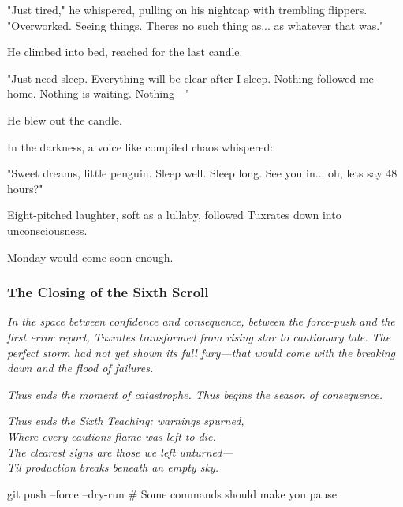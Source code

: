 "Just tired," he whispered, pulling on his nightcap with trembling flippers. "Overworked. Seeing things. There\textquotesingle s no such thing as... as whatever that was."

He climbed into bed, reached for the last candle.

"Just need sleep. Everything will be clear after I sleep. Nothing followed me home. Nothing is waiting. Nothing---"

He blew out the candle.

In the darkness, a voice like compiled chaos whispered:

"Sweet dreams, little penguin. Sleep well. Sleep long. See you in... oh, let\textquotesingle s say 48 hours?"

Eight-pitched laughter, soft as a lullaby, followed Tuxrates down into unconsciousness.

Monday would come soon enough.

\bookdivider

\subsubsection{The Closing of the Sixth Scroll}\label{the-closing-of-the-sixth-scroll}

\emph{In the space between confidence and consequence, between the force-push and the first error report, Tuxrates transformed from rising star to cautionary tale. The perfect storm had not yet shown its full fury---that would come with the breaking dawn and the flood of failures.}

\emph{Thus ends the moment of catastrophe. Thus begins the season of consequence.}

\bookdivider

\emph{Thus ends the Sixth Teaching: warnings spurned,}\\
\emph{Where every caution\textquotesingle s flame was left to die.}\\
\emph{The clearest signs are those we left unturned---}\\
\emph{\textquotesingle Til production breaks beneath an empty sky.}

\begin{codeblock}
git push --force --dry-run
# Some commands should make you pause
\end{codeblock}

\bookdivider

\label{performing_arts-closing-of-the-scroll}


